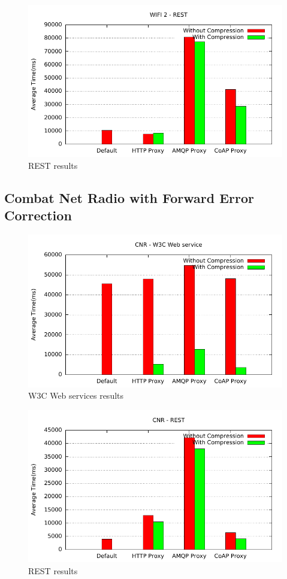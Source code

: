 \begin{figure}[H]
\center
\includegraphics[scale=0.75]{../results/wifi2/rest/out.pdf}
\caption{REST results}
\end{figure}

\subsection{Combat Net Radio with Forward Error Correction}

\begin{figure}[H]
\center
\includegraphics[scale=0.75]{../results/cnr/nffi/out.pdf}
\caption{W3C Web services results}
\end{figure}

\begin{figure}[H]
\center
\includegraphics[scale=0.75]{../results/cnr/rest/out.pdf}
\caption{REST results}
\end{figure}



